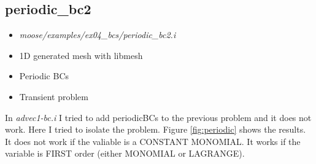 \documentclass[11pt,letterpaper]{article}
\begin{document}
	\subsection{periodic\_bc2}

	\begin{itemize}
		\item \textit{moose/examples/ex04\_bcs/periodic\_bc2.i}
		\item 1D generated mesh with libmesh
		\item Periodic BCs
		\item Transient problem
	\end{itemize}

    In \textit{advec1-bc.i} I tried to add periodicBCs to the previous problem and it does not work.
    Here I tried to isolate the problem.
    Figure \ref{fig:periodic} shows the results.
    It does not work if the valiable is a CONSTANT MONOMIAL.
    It works if the variable is FIRST order (either MONOMIAL or LAGRANGE).
\end{document}
